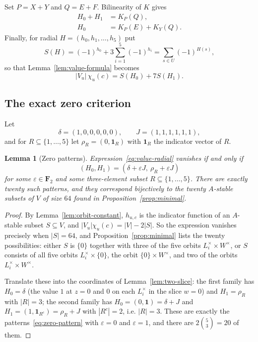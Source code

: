 \documentclass[11pt,a4paper,reqno]{amsart}
\newtheorem{lemma}[theorem]{Lemma}
\theoremstyle{definition}
\theoremstyle{remark}
\newcommand{\F}{\mathbf F}
\newcommand{\one}{\mathbf 1}
\begin{document}
Set $P=X+Y$ and $Q=E+F$.  Bilinearity of $K$ gives
\begin{align}
 H_0+H_1&=K_P(Q),\label{eq:Hsum}\\
 H_0&=K_P(E)+K_Y(Q).\label{eq:H0-reduced}
\end{align}
Finally, for radial $H=(h_0,h_1,\dots,h_5)$ put
\[
 S(H)=(-1)^{h_0}+3\sum_{i=1}^5(-1)^{h_i}
 =\sum_{s\in U}(-1)^{H(s)},
\]
so that Lemma~\ref{lem:value-formula} becomes
\begin{equation}\label{eq:value-radial}
 |V_u|\,\chi_u(c)=S(H_0)+7S(H_1).
\end{equation}

\subsection*{The exact zero criterion}\label{sec:criterion}

Let
\[
 \delta=(1,0,0,0,0,0),\qquad
 J=(1,1,1,1,1,1),
\]
and for $R\subseteq\{1,\dots,5\}$ let $\rho_R=(0,\one_R)$ with
$\one_R$ the indicator vector of $R$.

\begin{lemma}[Zero patterns]\label{lem:zero-patterns}
Expression~\eqref{eq:value-radial} vanishes if and only if
\begin{equation}\label{eq:zero-pattern}
 (H_0,H_1)=(\delta+\varepsilon J,\ \rho_R+\varepsilon J)
\end{equation}
for some $\varepsilon\in\F_2$ and some three-element subset
$R\subseteq\{1,\dots,5\}$.  There are exactly twenty such patterns, and
they correspond bijectively to the twenty $A$-stable subsets of $V$ of
size $64$ found in Proposition~\ref{prop:minimal}.
\end{lemma}

\begin{proof}
By Lemma~\ref{lem:orbit-constant}, $h_{u,c}$ is the indicator function
of an $A$-stable subset $S\subseteq V$, and
$|V_u|\chi_u(c)=|V|-2|S|$.  So the expression vanishes precisely when
$|S|=64$, and Proposition~\ref{prop:minimal} lists the twenty
possibilities: either $S$ is $\{0\}$ together with three of the five
orbits $L_i^\times\times W^\times$, or $S$ consists of all five orbits
$L_i^\times\times\{0\}$, the orbit $\{0\}\times W^\times$, and two of
the orbits $L_i^\times\times W^\times$.

Translate these into the coordinates of Lemma~\ref{lem:two-slice}: the
first family has $H_0=\delta$ (the value $1$ at $z=0$ and $0$ on each
$L_i^\times$ in the slice $w=0$) and $H_1=\rho_R$ with $|R|=3$; the
second family has $H_0=(0,\one)=\delta+J$ and
$H_1=(1,\one_{R^{c}})=\rho_R+J$ with $|R^{c}|=2$, i.e. $|R|=3$.  These
are exactly the patterns~\eqref{eq:zero-pattern} with $\varepsilon=0$
and $\varepsilon=1$, and there are $2\binom53=20$ of them.
\end{proof}
\end{document}
